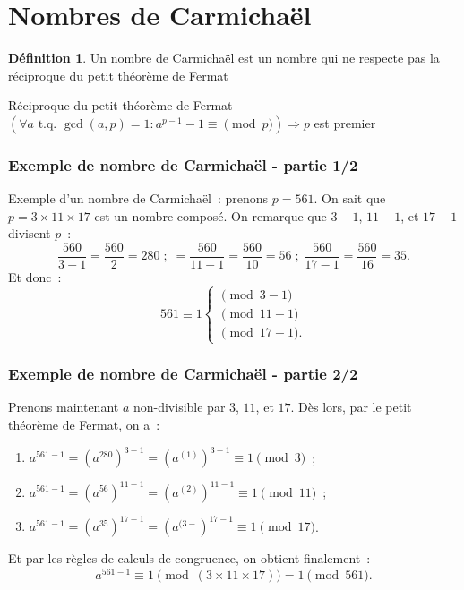 \documentclass[10pt, mathserif]{beamer}
\newcommand{\tq}{\text{ t.q. }}
\theoremstyle{definition}
\newtheorem{déf}[thm]{Définition}
\theoremstyle{remark}
\begin{document}
\section{Nombres de Carmichaël}
	\begin{frame}
		\begin{déf}
			Un nombre de Carmichaël est un nombre  qui ne respecte pas la réciproque du petit théorème de Fermat
		\end{déf}

		\begin{block}{Réciproque du petit théorème de Fermat}
			$\left(\forall a \tq \gcd(a, p) = 1 : a^{p-1}-1 \equiv \pmod p\right) \Rightarrow p$ est premier
		\end{block}
	\end{frame}

	\begin{frame}
		\frametitle{Exemple de nombre de Carmichaël - partie 1/2}
		Exemple d'un nombre de Carmichaël~: prenons $p = 561$. On sait que $p = 3 \times 11 \times 17$ est un nombre composé. On remarque que $3-1$, $11-1$,
		et $17-1$ divisent $p$~:
		\[\frac {560}{3-1} = \frac {560}2 = 280 \;;\; = \frac {560}{11-1} = \frac {560}{10} = 56 \;;\; \frac {560}{17-1} = \frac {560}{16} = 35.\]
		Et donc~:
		\[561 \equiv 1 \begin{cases}\pmod {3-1} \\ \pmod {11-1} \\ \pmod {17-1}.\end{cases}\]
	\end{frame}

	\begin{frame}
		\frametitle{Exemple de nombre de Carmichaël - partie 2/2}
		Prenons maintenant $a$ non-divisible par $3$, $11$, et $17$. Dès lors, par le petit théorème de Fermat, on a~:
		\begin{enumerate}
			\item $a^{561-1} = \left(a^{280}\right)^{3-1} = (a^{(1)})^{3 -1} \equiv 1 \pmod {3}$~;
			\item $a^{561-1} = \left(a^{56}\right)^{11-1} = (a^{(2)})^{11-1} \equiv 1 \pmod {11}$~;
			\item $a^{561-1} = \left(a^{35}\right)^{17-1} = (a^{(3-})^{17-1} \equiv 1 \pmod {17}$.
		\end{enumerate}

		Et par les règles de calculs de congruence, on obtient finalement~:
		\[a^{561-1} \equiv 1 \pmod {(3 \times 11 \times 17)} = 1 \pmod {561}.\]
	\end{frame}
\end{document}
